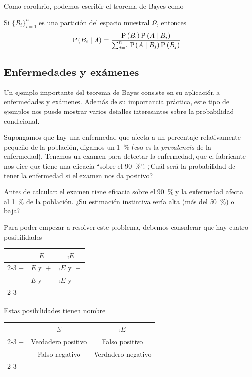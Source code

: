 Como corolario, podemos escribir el teorema de Bayes como
\begin{corollary}
    Si \(\{B_i\}_{i=1}^n\) es una partición del espacio muestral \(\Omega\), entonces
    \[\operatorname{P}\left(B_i\;\middle|\;A\right) = \frac{\operatorname{P}\left(B_i\right)\operatorname{P}\left(A\;\middle|\;B_i\right)}{\sum_{j=1}^n \operatorname{P}\left(A\;\middle|\;B_j\right) \operatorname{P}\left(B_j\right)}\]
\end{corollary}
\informal

\subsection{Enfermedades y exámenes}
\label{enfermedades_examenes}

Un ejemplo importante del teorema de Bayes consiste en su aplicación a enfermedades y exámenes. Además de su importancia práctica, este tipo de ejemplos nos puede mostrar varios detalles interesantes sobre la probabilidad condicional.

Supongamos que hay una enfermedad que afecta a un porcentaje relativamente pequeño de la población, digamos un \qty{1}{\percent} (eso es la \emph{prevalencia} de la enfermedad). Tenemos un examen para detectar la enfermedad, que el fabricante nos dice que tiene una eficacia \enquote{sobre el \qty{90}{\percent}}. ¿Cuál será la probabilidad de tener la enfermedad si el examen nos da positivo?

\begin{pausa}
Antes de calcular: el examen tiene eficacia sobre el \qty{90}{\percent} y la enfermedad afecta al \qty{1}{\percent} de la población. ¿Su estimación instintiva sería alta (más del \qty{50}{\percent}) o baja?
\end{pausa}

Para poder empezar a resolver este problema, debemos considerar que hay cuatro posibilidades

\begin{center}
{\renewcommand{\arraystretch}{1.6}%
\begin{tabular}{l | c | c|}
\multicolumn{1}{c}{} & \multicolumn{1}{c|}{$E$} & \multicolumn{1}{c}{$\comp{E}$}  \\
\cline{2-3}
$+$ & $E\text{ y } +$ & $\comp{E}\text{ y } +$  \\
\hline
$-$ & $E\text{ y } -$ & $\comp{E}\text{ y } -$  \\
\cline{2-3}
\end{tabular}%
}
\end{center}

Estas posibilidades tienen nombre
\begin{center}
    {\renewcommand{\arraystretch}{1.6}%
\begin{tabular}{l | c | c|}
 \multicolumn{1}{c}{} & \multicolumn{1}{c|}{$E$} & \multicolumn{1}{c}{$\comp{E}$}  \\
\cline{2-3}
$+$ & Verdadero positivo & Falso positivo  \\
\hline
$-$ & Falso negativo & Verdadero negativo  \\
\cline{2-3}
\end{tabular}%
    }
\end{center}

